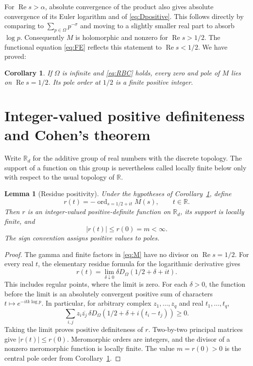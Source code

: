 \documentclass[11pt]{article}
\newtheorem{lemma}[theorem]{Lemma}
\newtheorem{corollary}[theorem]{Corollary}
\theoremstyle{definition}
\theoremstyle{remark}
\newcommand{\R}{\mathbb R}
\newcommand{\ord}{\operatorname{ord}}
\newcommand{\Rea}{\operatorname{Re}}
\numberwithin{equation}{section}
\begin{document}
For $\Rea s>\alpha$, absolute convergence of the product also gives absolute convergence of its Euler logarithm and of \eqref{eq:Dpositive}. This follows directly by comparing to $\sum_{p\in\Omega}p^{-\sigma}$ and moving to a slightly smaller real part to absorb $\log p$. Consequently $M$ is holomorphic and nonzero for $\Rea s>1/2$. The functional equation \eqref{eq:FE} reflects this statement to $\Rea s<1/2$. We have proved:

\begin{corollary}\label{cor:line}
If $\Omega$ is infinite and \eqref{eq:RBC} holds, every zero and pole of $M$ lies on $\Rea s=1/2$. Its pole order at $1/2$ is a finite positive integer.
\end{corollary}

\section{Integer-valued positive definiteness and Cohen's theorem}

Write $\R_d$ for the additive group of real numbers with the discrete topology. The support of a function on this group is nevertheless called locally finite below only with respect to the usual topology of $\R$.

\begin{lemma}[Residue positivity]\label{lem:PD}
Under the hypotheses of Corollary~\ref{cor:line}, define
\[
r(t)=-\ord_{s=1/2+it}M(s),\qquad t\in\R.
\]
Then $r$ is an integer-valued positive-definite function on $\R_d$, its support is locally finite, and
\[
|r(t)|\le r(0)=m<\infty.
\]
The sign convention assigns positive values to poles.
\end{lemma}

\begin{proof}
The gamma and finite factors in \eqref{eq:M} have no divisor on $\Rea s=1/2$. For every real $t$, the elementary residue formula for the logarithmic derivative gives
\begin{equation}\label{eq:Abel}
r(t)=\lim_{\delta\downarrow0}\delta
D_\Omega(1/2+\delta+it).
\end{equation}
This includes regular points, where the limit is zero. For each $\delta>0$, the function before the limit is an absolutely convergent positive sum of characters $t\mapsto e^{-itk\log p}$. In particular, for arbitrary complex $z_1,\dots,z_q$ and real $t_1,\dots,t_q$,
\[
\sum_{i,j}z_i\overline{z_j}\,
\delta D_\Omega(1/2+\delta+i(t_i-t_j))\ge0.
\]
Taking the limit proves positive definiteness of $r$. Two-by-two principal matrices give $|r(t)|\le r(0)$. Meromorphic orders are integers, and the divisor of a nonzero meromorphic function is locally finite. The value $m=r(0)>0$ is the central pole order from Corollary~\ref{cor:line}.
\end{proof}
\end{document}
